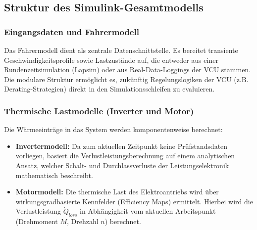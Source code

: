 


\subsection{Struktur des Simulink-Gesamtmodells}

\subsubsection{Eingangsdaten und Fahrermodell}
Das Fahrermodell dient als zentrale Datenschnittstelle. Es bereitet transiente Geschwindigkeitsprofile sowie Lastzustände auf, die entweder aus einer Rundenzeitsimulation (Lapsim) oder aus Real-Data-Loggings der VCU stammen. Die modulare Struktur ermöglicht es, zukünftig Regelungslogiken der VCU (z.B. Derating-Strategien) direkt in den Simulationsschleifen zu evaluieren.

\subsubsection{Thermische Lastmodelle (Inverter und Motor)}
Die Wärmeeinträge in das System werden komponentenweise berechnet:
\begin{itemize}
    \item \textbf{Invertermodell:} Da zum aktuellen Zeitpunkt keine Prüfstandsdaten vorliegen, basiert die Verlustleistungsberechnung auf einem analytischen Ansatz, welcher Schalt- und Durchlassverluste der Leistungselektronik mathematisch beschreibt.
    \item \textbf{Motormodell:} Die thermische Last des Elektroantriebs wird über wirkungsgradbasierte Kennfelder (Efficiency Maps) ermittelt. Hierbei wird die Verlustleistung $\dot{Q}_{loss}$ in Abhängigkeit vom aktuellen Arbeitspunkt (Drehmoment $M$, Drehzahl $n$) berechnet.
\end{itemize}

